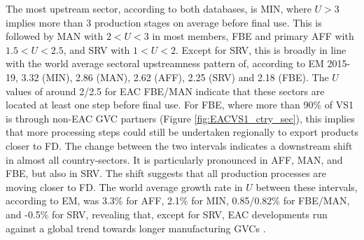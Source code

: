 \documentclass[a4paper]{article}
\begin{document}
 The most upstream sector, according to both databases, is MIN, where $U>3$ implies more than 3 production stages on average before final use. This is followed by MAN with $2 <U <3$ in most members, FBE and primary AFF with $1.5 <U <2.5$, and SRV with $1 <U <2$. Except for SRV, this is broadly in line with the world average sectoral upstreamness pattern of, according to EM 2015-19, 3.32 (MIN), 2.86 (MAN), 2.62 (AFF), 2.25 (SRV) and 2.18 (FBE). The $U$ values of around 2/2.5 for EAC FBE/MAN indicate that these sectors are located at least one step before final use. For FBE, where more than 90\% of VS1 is through non-EAC GVC partners (Figure \ref{fig:EACVS1_ctry_sec}), this implies that more processing steps could still be undertaken regionally to export products closer to FD. The change between the two intervals indicates a downstream shift in almost all country-sectors. It is particularly pronounced in AFF, MAN, and FBE, but also in SRV. The shift suggests that all production processes are moving closer to FD. The world average growth rate in $U$ between these intervals, according to EM, was 3.3\% for AFF, 2.1\% for MIN, 0.85/0.82\% for FBE/MAN, and -0.5\% for SRV, revealing that, except for SRV, EAC developments run against a global trend towards longer manufacturing GVCs \citep{antras2018measurement}. 
\end{document}
